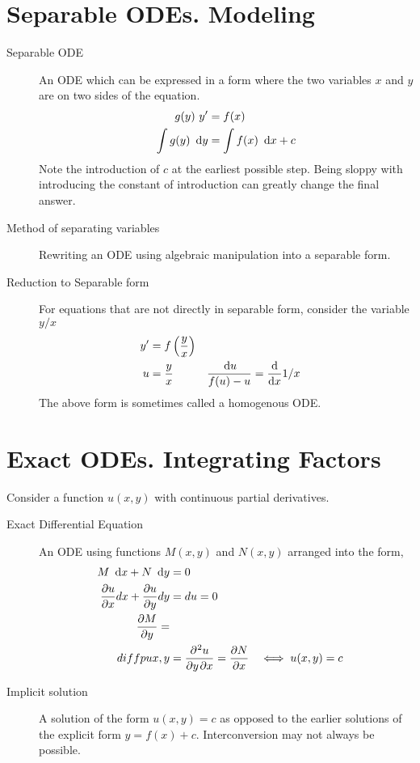 \section{Separable ODEs. Modeling}

\begin{description}
    \item[Separable ODE] An ODE which can be expressed in a form where the two variables $x$ and $y$ are on two sides of the equation.
        \begin{align}
            g(y) \  y'       & = f(x)                 \\
            \int g(y)\ \dl y & = \int f(x)\ \dl x + c
        \end{align}
        Note the introduction of $c$ at the earliest possible step. Being sloppy with introducing the constant of introduction can greatly change the final answer.
    \item[Method of separating variables] Rewriting an ODE using algebraic manipulation into a separable form.
    \item[Reduction to Separable form] For equations that are not directly in separable form, consider the variable $y/x$
        \begin{align}
            y' & = f\left(\frac{y}{x}\right)                                             \\
            u  & = \frac{y}{x}               & \frac{\dl u}{f(u) - u} & = \diff*{1/x}{x}
        \end{align}
        The above form is sometimes called a homogenous ODE.
\end{description}

\section{Exact ODEs. Integrating Factors}
Consider a function $ u(x, y) $ with continuous partial derivatives.
\begin{description}
    \item[Exact Differential Equation] An ODE using functions $ M(x, y) $ and $ N(x, y) $
        arranged into the form,
        \begin{align}
            M\ \dl x + N\ \dl y               & = 0      \\
            \diffp{u}{x} dx + \diffp{u}{y} dy & = du = 0 \\
            \diffp{M}{y} =                               \\diffp{u}{x, y} & = \diffp{u}{y, x} = \diffp{N}{x} & \iff u(x, y) & = c
        \end{align}
    \item[Implicit solution] A solution of the form $ u(x, y) = c$ as opposed to the earlier
        solutions of the explicit form $ y = f(x) + c $. Interconversion may not always be possible.
\end{description}

